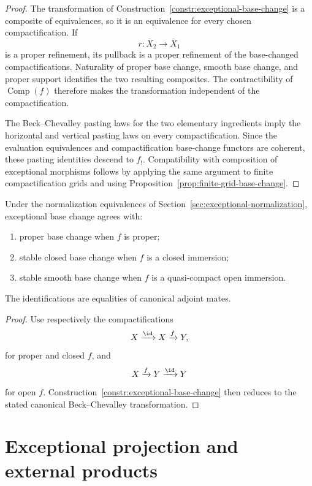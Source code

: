 \begin{proof}
The transformation of Construction~\ref{constr:exceptional-base-change} is
a composite of equivalences, so it is an equivalence for every chosen
compactification.  If
\[
    r:\overline X_2\longrightarrow\overline X_1
\]
is a proper refinement, its pullback is a proper refinement of the
base-changed compactifications.  Naturality of proper base change, smooth
base change, and proper support identifies the two resulting composites.
The contractibility of \(\operatorname{Comp}(f)\) therefore makes the
transformation independent of the compactification.

The Beck--Chevalley pasting laws for the two elementary ingredients imply
the horizontal and vertical pasting laws on every compactification.  Since
the evaluation equivalences and compactification base-change functors are
coherent, these pasting identities descend to \(f_!\).  Compatibility with
composition of exceptional morphisms follows by applying the same argument
to finite compactification grids and using
Proposition~\ref{prop:finite-grid-base-change}.
\end{proof}

\begin{corollary}
\label{cor:exceptional-base-change-normalization}
Under the normalization equivalences of
Section~\ref{sec:exceptional-normalization}, exceptional base change agrees
with:
\begin{enumerate}
    \item proper base change when \(f\) is proper;
    \item stable closed base change when \(f\) is a closed immersion;
    \item stable smooth base change when \(f\) is a quasi-compact open
    immersion.
\end{enumerate}
The identifications are equalities of canonical adjoint mates.
\end{corollary}

\begin{proof}
Use respectively the compactifications
\[
    X\xrightarrow{\id}X\xrightarrow{f}Y,
\]
for proper and closed \(f\), and
\[
    X\xrightarrow{f}Y\xrightarrow{\id}Y
\]
for open \(f\).  Construction~\ref{constr:exceptional-base-change} then
reduces to the stated canonical Beck--Chevalley transformation.
\end{proof}

\section{Exceptional projection and external products}
\label{sec:exceptional-projection}

